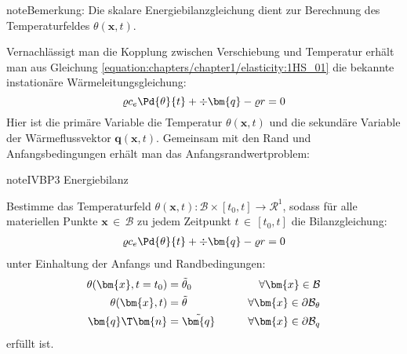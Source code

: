 \documentclass[letterpaper,10pt,german]{jupyterBook}
\begin{document}
\begin{sphinxadmonition}{note}{Bemerkung:}
\sphinxAtStartPar
Die skalare Energiebilanzgleichung dient zur Berechnung des Temperaturfeldes \(\theta(\bm{x},t)\).
\end{sphinxadmonition}

\sphinxAtStartPar
Vernachlässigt man die Kopplung zwischen Verschiebung und Temperatur erhält man aus Gleichung \eqref{equation:chapters/chapter1/elasticity:1HS_01} die bekannte instationäre Wärmeleitungsgleichung:
\label{equation:chapters/chapter1/elasticity:18dc7df9-590c-425b-8135-e53e2449ffd9}\begin{equation}
\varrho c_e \Pd{\theta}{t} + \div{\bm{q}} - \varrho r = 0
\end{equation}
\sphinxAtStartPar
Hier ist die primäre Variable die Temperatur \(\theta(\bm{x},t)\) und die sekundäre Variable der Wärmeflussvektor \(\bm{q}(\bm{x},t)\). Gemeinsam mit den Rand\sphinxhyphen{} und Anfangsbedingungen erhält man das Anfangsrandwertproblem:

\begin{sphinxadmonition}{note}{IVBP3 \sphinxhyphen{} Energiebilanz}

\sphinxAtStartPar
Bestimme das Temperaturfeld \(\theta(\bm{x},t): \mathcal{B} \times [t_0,t] \rightarrow \mathcal{R}^1\), sodass für alle materiellen Punkte \(\bm{x} \, \in \, \mathcal{B}\) zu jedem Zeitpunkt \(t \, \in \, [t_0,t]\) die Bilanzgleichung:
\begin{equation*}
\begin{split}
\varrho c_e \Pd{\theta}{t} + \div{\bm{q}} - \varrho r = 0
\end{split}
\end{equation*}
\sphinxAtStartPar
unter Einhaltung der Anfangs\sphinxhyphen{} und Randbedingungen:
\begin{equation*}
\begin{split}
\theta(\bm{x},t=t_0) & = \tilde{\theta}_0 \qquad &\forall \bm{x} \in \mathcal{B}& \\
\theta(\bm{x},t) & = \tilde{\theta} \qquad &\forall \bm{x} \in \partial \mathcal{B}_{\theta}& \\
\bm{q}\T \bm{n} & = \tilde{\bm{q}} \qquad &\forall \bm{x} \in \partial\mathcal{B}_q&
\end{split}
\end{equation*}
\sphinxAtStartPar
erfüllt ist.
\end{sphinxadmonition}
\end{document}
